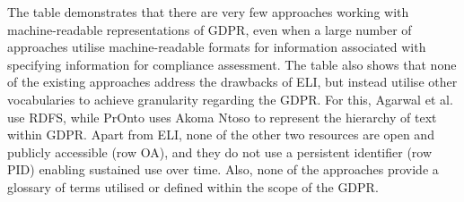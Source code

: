 The table demonstrates that there are very few approaches working with machine-readable representations of GDPR, even when a large number of approaches utilise machine-readable formats for information associated with specifying information for compliance assessment. The table also shows that none of the existing approaches address the drawbacks of ELI, but instead utilise other vocabularies to achieve granularity regarding the GDPR. For this, Agarwal et al. \cite{agarwal_legislative_2018} use RDFS, while PrOnto uses Akoma Ntoso to represent the hierarchy of text within GDPR.
Apart from ELI, none of the other two resources are open and publicly accessible (row OA), and they do not use a persistent identifier (row PID) enabling sustained use over time. Also, none of the approaches provide a glossary of terms utilised or defined within the scope of the GDPR.

